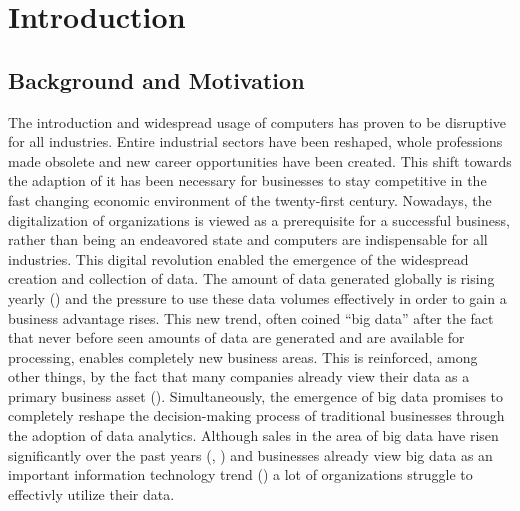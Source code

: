 \newpage\section{Introduction}

\subsection{Background and Motivation}

The introduction and widespread usage of computers has proven to be disruptive for all industries. Entire industrial sectors have been reshaped, whole professions made obsolete and new career opportunities have been created. This shift towards the adaption of \ac{it} has been necessary for businesses to stay competitive in the fast changing economic environment of the twenty-first century. Nowadays, the digitalization of organizations is viewed as a prerequisite for a successful business, rather than being an endeavored state and computers are indispensable for all industries. This digital revolution enabled the emergence of the widespread creation and collection of data. The amount of data generated globally is rising yearly (\cite{Seagate.2018}) and the pressure to use these data volumes effectively in order to gain a business advantage rises. 
This new trend, often coined \enquote{big data} after the fact that never before seen amounts of data are generated and are available for processing, enables completely new business areas. This is reinforced, among other things, by the fact that many companies already view their data as a primary business asset (\cite{Redman.2008}). Simultaneously, the emergence of big data promises to completely reshape the decision-making process of traditional businesses through the adoption of data analytics. Although sales in the area of big data have risen significantly over the past years (\cite{BISResearch.2018}, \cite{Bitkom.2018}) and businesses already view big data as an important information technology trend (\cite{Bitkom.2017}) a lot of organizations struggle to effectivly utilize their data. 

